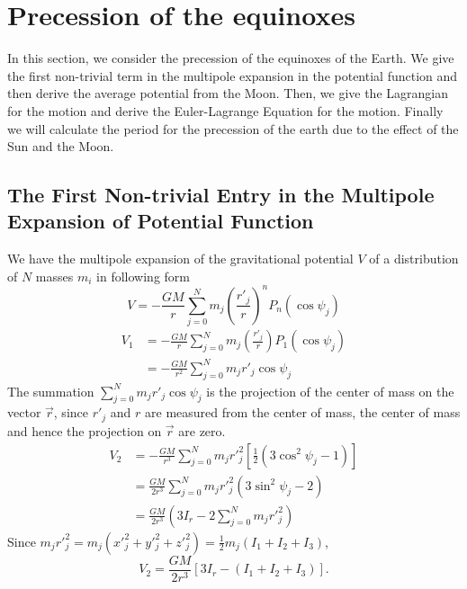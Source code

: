 \documentclass[%
 reprint,
 amsmath,amssymb,
 aps,
]{revtex4-1}
\begin{document}
\section{Precession of the equinoxes}
In this section, we consider the precession of the equinoxes of the Earth. We give the first non-trivial term in the multipole expansion in the potential function and then derive the average potential from the Moon. Then, we give the Lagrangian for the motion and derive the Euler-Lagrange Equation for the motion. Finally we will calculate the period for the precession of the earth due to the effect of the Sun and the Moon.
\subsection{The First Non-trivial Entry in the Multipole Expansion of Potential Function}
We have the multipole expansion of the gravitational potential $V$ of a distribution of $N$ masses $m_i$ in following form
\begin{equation}
    V=-\frac{GM}{r}\sum_{j=0}^{N}m_j(\frac{r'_j}{r})^nP_n(\cos{\psi_j})
\end{equation}
\begin{equation}
\begin{aligned}
    V_1&=-\frac{GM}{r}\sum_{j=0}^{N}m_j\left(\frac{r'_j}{r}\right)P_1(\cos \psi_j) \\
    &=-\frac{GM}{r^2}\sum_{j=0}^{N}m_jr'_j\cos \psi_j
\end{aligned}
\end{equation}
The summation $\sum_{j=0}^{N}m_jr'_j\cos \psi_j$ is the projection of the center of mass on the vector $\vec{r}$, since $r'_j$ and $r$ are measured from the center of mass, the center of mass and hence the projection on $\vec{r}$ are zero.
\begin{equation}
\begin{aligned}
    V_2&=-\frac{GM}{r^3}\sum_{j=0}^{N}m_jr'_j^2\left[\frac{1}{2}\left(3\cos^2\psi_j-1\right)\right] \\
    &=\frac{GM}{2r^3}\sum_{j=0}^{N}m_jr'_j^2\left(3\sin^2\psi_j-2\right) \\
    &=\frac{GM}{2r^3}\left(3I_r-2\sum_{j=0}^{N}m_jr'_j^2\right)
\end{aligned}
\end{equation}
Since $m_j r'_j^2=m_j(x'_j^2+y'_j^2+z'_j^2)=\frac{1}{2}m_j(I_1+I_2+I_3)$,
\begin{equation}
    V_2=\frac{GM}{2r^3}\left[3I_r-\left(I_1+I_2+I_3\right)\right].
\end{equation}
\end{document}
